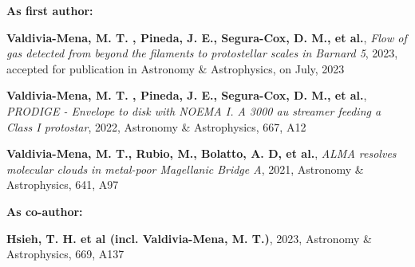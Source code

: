 \vspace{8pt}

\begin{cvparagraph}
\textbf{As first author:}
\vspace{4pt}
\begin{cvitems} %
	\item{\textbf{Valdivia-Mena, M. T. , Pineda, J. E., Segura-Cox, D. M., et al.}, \textit{Flow of gas detected from beyond the filaments to protostellar scales in Barnard 5}, 2023, accepted for publication in Astronomy \& Astrophysics, on July, 2023}
	\item{\textbf{Valdivia-Mena, M. T. , Pineda, J. E., Segura-Cox, D. M., et al.}, \textit{PRODIGE - Envelope to disk with NOEMA I. A 3000 au streamer feeding a Class I protostar}, 2022, Astronomy \& Astrophysics, 667, A12}
	\item{\textbf{Valdivia-Mena, M. T., Rubio, M., Bolatto, A. D, et al.}, \textit{ALMA resolves molecular clouds in metal-poor Magellanic Bridge A}, 2021, Astronomy \& Astrophysics, 641, A97}
\end{cvitems}
\vspace{8pt}
\textbf{As co-author:}
\vspace{4pt}
\begin{cvitems} %
	\item{{\textbf{Hsieh, T. H. et al (incl. Valdivia-Mena, M. T.)}, 2023, Astronomy \& Astrophysics, 669, A137}}
	
\end{cvitems}
\vspace{4pt}
\end{cvparagraph}



